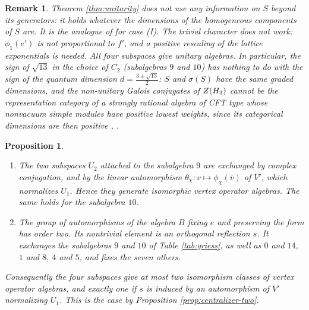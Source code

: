\documentclass[leqno]{article}
\let\cal\relax
\newcommand{\cal}{\mathcal}
\newcommand{\co}{\colon}
\newtheorem{prop}[thm]{Proposition}
\newtheorem{remark}[thm]{Remark}
\numberwithin{equation}{section}
\begin{document}
\begin{remark}\normalfont
\label{rem:unitarity-scope}
Theorem \ref{thm:unitarity} does not use any information on $S$ beyond its generators: it holds whatever the dimensions of the homogeneous components of $S$ are. It is the analogue of \cite[Section 3]{Rie26b} for case (I). The trivial character does not work: $\phi_1(e')$ is not proportional to $f'$, and a positive rescaling of the lattice exponentials is needed. All four subspaces give unitary algebras. In particular, the sign of $\sqrt{13}$ in the choice of $C_2$ (subalgebras $9$ and $10$) has nothing to do with the sign of the quantum dimension $d = \frac{3 \pm \sqrt{13}}{2}$: $S$ and $\sigma(S)$ have the same graded dimensions, and the non-unitary Galois conjugates of $Z(\cal H_3)$ \cite{EvG17} cannot be the representation category of a strongly rational algebra of CFT type whose nonvacuum simple modules have positive lowest weights, since its categorical dimensions are then positive \cite[Lemma 4.2]{DJX13}, \cite{Hua08}.
\end{remark}

\begin{prop}
\label{prop:symmetries}
\begin{enumerate}
\item The two subspaces $U_2$ attached to the subalgebra $9$ are exchanged by complex conjugation, and by the linear automorphism $\theta_\chi \co v \mapsto \phi_\chi(\overline{v})$ of $V'$, which normalizes $U_1$. Hence they generate isomorphic vertex operator algebras. The same holds for the subalgebra $10$.
\item The group of automorphisms of the algebra $B$ fixing $e$ and preserving the form has order two. Its nontrivial element is an orthogonal reflection $s$. It exchanges the subalgebras $9$ and $10$ of Table \ref{tab:griess}, as well as $0$ and $14$, $1$ and $8$, $4$ and $5$, and fixes the seven others.
\end{enumerate}
Consequently the four subspaces give at most two isomorphism classes of vertex operator algebras, and exactly one if $s$ is induced by an automorphism of $V'$ normalizing $U_1$. This is the case by Proposition \ref{prop:centralizer-two}.
\end{prop}
\end{document}
